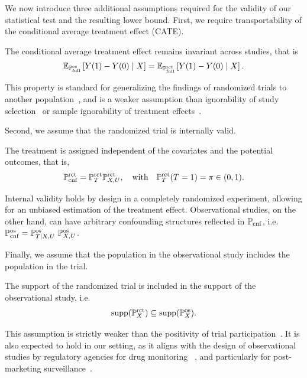 We now introduce three additional assumptions required for the validity of our statistical test and the resulting lower bound.
First, we require transportability of the conditional average treatment effect (CATE). 


\begin{assumption}[Transportability] 
\label{asm:transportability}
The conditional average treatment effect remains invariant across studies, that is
\begin{align*}
\mathbb{E}_{\mathbb{P} ^{\operatorname{os}}_{\operatorname{full}}}\left[Y(1) -Y(0)  \mid X\right]
= \mathbb{E}_{\mathbb{P} ^{\operatorname{rct}}_{\operatorname{full}}}\left[Y(1) -Y(0)  \mid X\right].
\end{align*}
\end{assumption}
This property is standard for generalizing the findings of randomized trials to another population~\citep{o2014generalizing,colnet2020causal,degtiar2023review}, and is a weaker assumption than  ignorability of study selection~\citep{sugden1984ignorable, hotz2005predicting}
or sample ignorability of treatment effects~\citep{kern2016assessing}. 

Second, we assume that the randomized trial is internally valid.

\begin{assumption} 
\label{asm:internalvalid}
The treatment is assigned independent of the covariates and the potential outcomes, that is, 
\begin{align*}
\mathbb{P}^{\operatorname{rct}}_{\operatorname{cnf}}  =\mathbb{P}^{\operatorname{rct}}_{T} \mathbb{P}^{\operatorname{rct}}_{X, U}, \quad \mathrm{with} \quad \mathbb{P}^{\operatorname{rct}}_T(T=1) = \pi \in (0,1). 
\end{align*}
\end{assumption} 
Internal validity holds by design in a completely randomized experiment, allowing for an unbiased estimation of the treatment effect. Observational studies, on the other hand, can have arbitrary confounding structures reflected in $\mathbb{P}_{\operatorname{cnf}}$, i.e. $\mathbb{P}_{\operatorname{cnf}}^{\operatorname{os}}  =\mathbb{P}^{\operatorname{os}}_{ T \vert X,U} ~\mathbb{P}^{\operatorname{os}}_{X,U}$.


Finally, we assume that the population in the observational study includes the population in the trial.
\begin{assumption} 
\label{asm:nested_support}
The support of the randomized trial is included in the support of the observational study, i.e.
$${\operatorname{supp}}(\mathbb{P}^{\operatorname{rct}}_X) \subseteq {\operatorname{supp}}(\mathbb{P}^{\operatorname{os}}_X).$$
\end{assumption}
 This assumption is strictly weaker than the positivity of trial participation~\citep{stuart2011use, hartman2015sample, andrews2017weighting, nie2021covariate, colnet2022reweighting}. It is also expected to hold in our setting, as it aligns with the design of observational studies by regulatory agencies for drug monitoring ~\citep{he2020clinical}, and particularly for post-marketing surveillance~\citep{franklin2019evaluating, schurman2019framework}.



